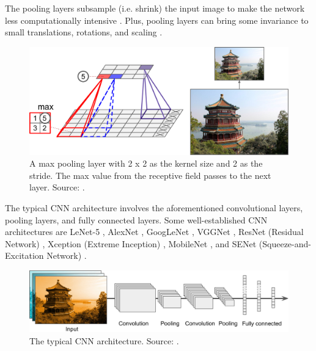 \documentclass[a4paper, 11pt, oneside]{article}
\begin{document}
The pooling layers subsample (i.e. shrink) the input image to make the network less computationally intensive
\cite{geron2019hands}. Plus, pooling layers can bring some invariance to small translations, rotations, and scaling
\cite{geron2019hands}.

\begin{figure}[ht]
  \begin{center}
    \includegraphics[width=.5\textwidth]{max_pooling.png}
  \end{center}
  \caption{A max pooling layer with 2 x 2 as the kernel size and 2 as the stride. The max value from the receptive
  field passes to the next layer. Source: \cite{geron2019hands}.}
\end{figure}

The typical CNN architecture involves the aforementioned convolutional layers, pooling layers, and fully connected layers.
Some well-established CNN architectures are LeNet-5 \cite{lecun1998gradient}, AlexNet \cite{krizhevsky2012imagenet},
GoogLeNet \cite{szegedy2015going}, VGGNet \cite{simonyan2014very}, ResNet (Residual Network) \cite{he2016deep}, Xception
(Extreme Inception) \cite{chollet2017xception}, MobileNet \cite{howard2017mobilenets, sandler2018mobilenetv2},
and SENet (Squeeze-and-Excitation Network) \cite{hu2018squeeze}.

\begin{figure}[ht]
  \begin{center}
    \includegraphics[width=.8\textwidth]{typical_cnn.png}
  \end{center}
  \caption{The typical CNN architecture. Source: \cite{geron2019hands}.}
\end{figure}
\end{document}
